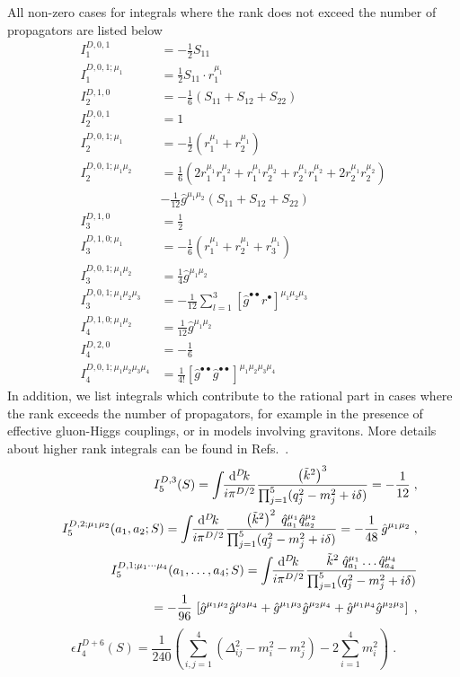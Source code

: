 \documentclass[11pt,a4paper]{refrep}
\newcommand{\diff}[1][{}]{{\mathrm{d}}^{#1}\!}
\newcommand{\bea}{\begin{eqnarray*}}
\newcommand{\eea}{\end{eqnarray*}\noindent}
\newcommand{\be}{\begin{equation}}
\newcommand{\ee}{\end{equation}}
\newcommand{\nn}{\nonumber}
\def\eps{\epsilon}
\begin{document}
All  non-zero cases for 
integrals where the rank does not exceed the number of propagators are listed
 below~\cite{Binoth:2006hk,Reiter:2009kb}
\begin{align}
I_1^{D,0,1}&=-\frac12 S_{11}\\
I_1^{D,0,1;\mu_1}&=\frac12 S_{11} \cdot r_1^{\mu_1}\\
I_2^{D,1,0}&=-\frac16\left(S_{11}+S_{12}+S_{22}\right)\\
I_2^{D,0,1}&=1\\
I_2^{D,0,1;\mu_1}&=-\frac12\left(r_1^{\mu_1}+r_2^{\mu_1}\right)\\
I_2^{D,0,1;\mu_1\mu_2}&=
\frac16\left(%
2r_1^{\mu_1}r_1^{\mu_2}
+r_1^{\mu_1}r_2^{\mu_2}
+r_2^{\mu_1}r_1^{\mu_2}
+2r_2^{\mu_1}r_2^{\mu_2}\right)\nonumber\\
&-\frac1{12}\hat{g}^{\mu_1\mu_2}\left(S_{11}+S_{12}+S_{22}\right)\\
I_3^{D,1,0}&=\frac12\\
I_3^{D,1,0;\mu_1}&=-\frac16\left(r_1^{\mu_1}+r_2^{\mu_1}+r_3^{\mu_1}\right)\\
I_3^{D,0,1;\mu_1\mu_2}&=\frac14\hat{g}^{\mu_1\mu_2}\\
I_3^{D,0,1;\mu_1\mu_2\mu_3}&=-\frac{1}{12}
\sum_{l=1}^3\left[\hat{g}^{\bullet\bullet}r^{\bullet}\right]^{\mu_1\mu_2\mu_3}%
\\
I_4^{D,1,0;\mu_1\mu_2}&=\frac{1}{12}\hat{g}^{\mu_1\mu_2}\\
I_4^{D,2,0}&=-\frac16\\
I_4^{D,0,1;\mu_1\mu_2\mu_3\mu_4}&=\frac1{4!}\left[\hat{g}^{\bullet\bullet}%
\hat{g}^{\bullet\bullet}\right]^{\mu_1\mu_2\mu_3\mu_4}
\end{align}
In addition, we list integrals which contribute to the rational part in cases where the rank exceeds the number of 
propagators, for example in the presence of effective gluon-Higgs couplings, or in models involving 
gravitons.  
More details about higher rank integrals can be found in
Refs.~\cite{Guillet:2013msa,Mastrolia:2012bu,vanDeurzen:2013pja}.
\bea
&&I_5^{D,3}(S)=
\int\!\!\frac{\diff[D]k}{i\pi^{D/2}}\frac{\left(\tilde{k}^2\right)^3
}{%
\prod_{j=1}^5(q_j^2-m_j^2+i\delta)}=-\frac{1}{12}\;,\\
%
&&I_5^{D,2;\mu_1 \mu_2}(a_1,a_2; S)=
\int\!\!\frac{\diff[D]k}{i\pi^{D/2}}\frac{\left(\tilde{k}^2\right)^2\;
\hat{q}_{a_1}^{\mu_1}  \hat{q}_{a_2}^{\mu_2}}{%
\prod_{j=1}^5(q_j^2-m_j^2+i\delta)}=-\frac{1}{48}\,\hat{g}^{\mu_1\mu_2}\;,\\
%
&&I_5^{D,1;\mu_1\cdots \mu_4}(a_1,\ldots,a_4; S)=
\int\!\!\frac{\diff[D]k}{i\pi^{D/2}}\frac{\tilde{k}^2\;
\hat{q}_{a_1}^{\mu_1} \ldots \hat{q}_{a_4}^{\mu_4}}{%
\prod_{j=1}^5(q_j^2-m_j^2+i\delta)}\nn\\
&&\qquad =-\frac{1}{96}\,
\left[\hat{g}^{\mu_1\mu_2}\hat{g}^{\mu_3\mu_4}+ \hat{g}^{\mu_1\mu_3}\hat{g}^{\mu_2\mu_4}
+\hat{g}^{\mu_1\mu_4}\hat{g}^{\mu_2\mu_3}\right]\;,
\eea
\be
\eps I_4^{D+6}(S)=\frac{1}{240}\left(\sum_{i,j=1}^4 (\Delta^2_{ij}-m_i^2-m_j^2)-2\sum_{i=1}^4 m_i^2\right)\;.
\ee
\end{document}
